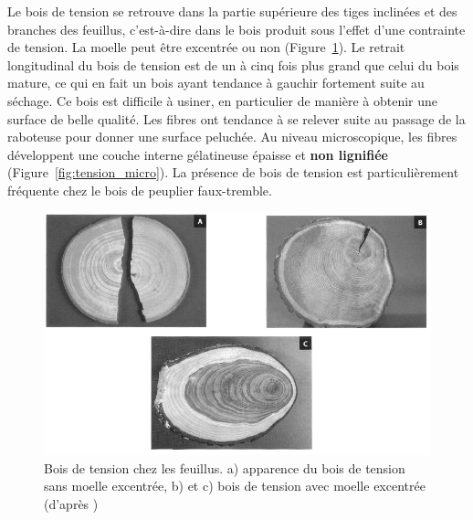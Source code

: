 Le bois de tension se retrouve dans la partie supérieure des tiges inclinées et des branches des feuillus, c'est-à-dire dans le bois produit sous l'effet d'une contrainte de tension. La moelle peut être excentrée ou non (Figure~\ref{fig:tension}). Le retrait longitudinal du bois de tension est de un à cinq fois plus grand que celui du bois mature, ce qui en fait un bois ayant tendance à gauchir fortement suite au séchage. Ce bois est difficile à usiner, en particulier de manière à obtenir une surface de belle qualité. Les fibres ont tendance à se relever suite au passage de la raboteuse pour donner une surface peluchée. Au niveau microscopique, les fibres développent une couche interne  \og gélatineuse \fg épaisse et \textbf{non lignifiée} (Figure~\ref{fig:tension_micro}). La présence de bois de tension est particulièrement fréquente chez le bois de peuplier faux-tremble. 

\begin{figure}[h]
	\centering
	\includegraphics[scale=0.55]{img/ch9_tension}
	\caption{Bois de tension chez les feuillus. a) apparence du bois de tension sans moelle excentrée, b) et c) bois de tension avec moelle excentrée (d'après \cite{hoadley1990identifying})}
	\label{fig:tension}
\end{figure}


